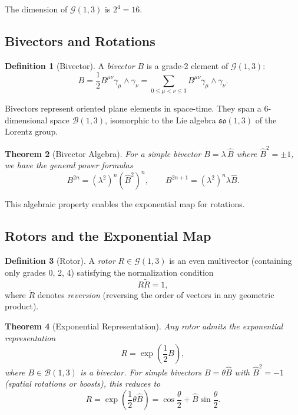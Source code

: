 \documentclass[11pt,a4paper]{article}
\numberwithin{equation}{section}
\theoremstyle{plain}
\newtheorem{theorem}{Theorem}[section]
\theoremstyle{definition}
\newtheorem{definition}[theorem]{Definition}
\theoremstyle{remark}
\newcommand{\Cl}{\mathcal{G}}               %
\newcommand{\rev}[1]{\widetilde{#1}}       %
\newcommand{\Biv}{\mathcal{B}}             %
\begin{document}
The dimension of $\Cl(1,3)$ is $2^4 = 16$.

\subsection{Bivectors and Rotations}

\begin{definition}[Bivector]
A \emph{bivector} $B$ is a grade-2 element of $\Cl(1,3)$:
\begin{equation}
B = \frac{1}{2}B^{\mu\nu}\gamma_\mu \wedge \gamma_\nu = \sum_{0 \le \mu < \nu \le 3} B^{\mu\nu}\gamma_\mu \wedge \gamma_\nu.
\label{eq:bivector-def}
\end{equation}
\end{definition}

Bivectors represent oriented plane elements in space-time. They span a 6-dimensional space $\Biv(1,3)$, isomorphic to the Lie algebra $\mathfrak{so}(1,3)$ of the Lorentz group.

\begin{theorem}[Bivector Algebra]
For a simple bivector $B = \lambda \, \hat{B}$ where $\hat{B}^2 = \pm 1$, we have the general power formulas
\begin{equation}
B^{2n} = (\lambda^2)^n (\hat{B}^2)^n, \qquad B^{2n+1} = (\lambda^2)^n \lambda \hat{B}.
\label{eq:bivector-powers}
\end{equation}
\end{theorem}

This algebraic property enables the exponential map for rotations.

\subsection{Rotors and the Exponential Map}

\begin{definition}[Rotor]
A \emph{rotor} $R \in \Cl(1,3)$ is an even multivector (containing only grades 0, 2, 4) satisfying the normalization condition
\begin{equation}
R \rev{R} = 1,
\label{eq:rotor-normalization}
\end{equation}
where $\rev{R}$ denotes \emph{reversion} (reversing the order of vectors in any geometric product).
\end{definition}

\begin{theorem}[Exponential Representation]
Any rotor admits the exponential representation
\begin{equation}
R = \exp\left(\frac{1}{2}B\right),
\label{eq:rotor-exponential}
\end{equation}
where $B \in \Biv(1,3)$ is a bivector. For simple bivectors $B = \theta \hat{B}$ with $\hat{B}^2 = -1$ (spatial rotations or boosts), this reduces to
\begin{equation}
R = \exp\left(\frac{1}{2}\theta\hat{B}\right) = \cos\frac{\theta}{2} + \hat{B}\sin\frac{\theta}{2}.
\label{eq:rotor-euler}
\end{equation}
\end{theorem}
\end{document}
